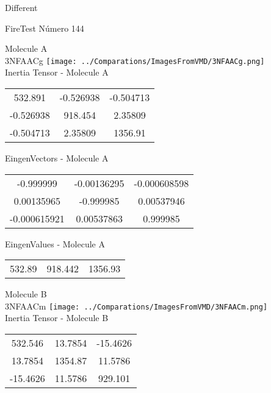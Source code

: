 \begin{center}
\vtab
\vtab
\textcolor{NavyBlue}{\Large Different}
\end{center}

 \newpage

\vtab[-2cm]
\begin{center}
{\large FireTest \tab Número 144}
\end{center}
\begin{multicols}{2}
\begin{center}

Molecule A \\ 
3NFAACg
\texttt{[image: ../Comparations/ImagesFromVMD/3NFAACg.png]}
\\
Inertia Tensor - Molecule A \\
\vtab

\begin{tabular}{|c c c|}
532.891	 & 	-0.526938	 & 	-0.504713	 \\
-0.526938	 & 	918.454	 & 	2.35809	 \\
-0.504713	 & 	2.35809	 & 	1356.91
\end{tabular}

\vtab
 EingenVectors - Molecule A     \\
\vtab
\begin{tabular}{|c c c|}
-0.999999	 & 	-0.00136295	 & 	-0.000608598	 \\
0.00135965	 & 	-0.999985	 & 	0.00537946	 \\
-0.000615921	 & 	0.00537863	 & 	0.999985
\end{tabular}

\vtab
 EingenValues - Molecule A     \\
\vtab
\begin{tabular}{|c c c|}
532.89	 & 	918.442	 & 	1356.93	 \\
\end{tabular}
\columnbreak

Molecule B \\ 
3NFAACm
\texttt{[image: ../Comparations/ImagesFromVMD/3NFAACm.png]}
\\
Inertia Tensor - Molecule B \\
\vtab

\begin{tabular}{|c c c|}
532.546	 & 	13.7854	 & 	-15.4626	 \\
13.7854	 & 	1354.87	 & 	11.5786	 \\
-15.4626	 & 	11.5786	 & 	929.101
\end{tabular}


\end{center}
\end{multicols}
